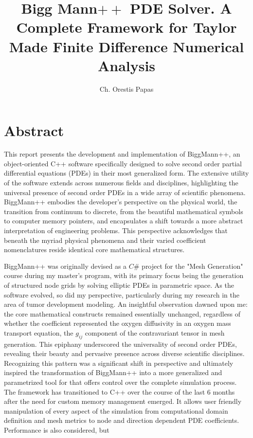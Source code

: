 \documentclass{article}
\title{Bigg Mann$++$ PDE Solver. A Complete Framework for Taylor Made Finite Difference Numerical Analysis}
\author{Ch. Orestis Papas}
\begin{document}
	\maketitle
	
	\section{Abstract}
	This report presents the development and implementation of BiggMann++, an object-oriented C++ software specifically designed to solve second order partial differential equations (PDEs) in their most generalized form. The extensive utility of the software extends across numerous fields and disciplines, highlighting the universal presence of second order PDEs in a wide array of scientific phenomena. BiggMann++ embodies the developer's perspective on the physical world, the transition from continuum to discrete, from the beautiful mathematical symbols to computer memory pointers, and encapsulates a shift towards a more abstract interpretation of engineering problems. This perspective acknowledges that beneath the myriad physical phenomena and their varied coefficient nomenclatures reside identical core mathematical structures.
	
	BiggMann++ was originally devised as a $C\#$ project for the "Mesh Generation" course during my master's program, with its primary focus being the generation of structured node grids by solving elliptic PDEs in parametric space. As the software evolved, so did my perspective, particularly during my research in the area of tumor development modeling. An insightful observation dawned upon me: the core mathematical constructs remained essentially unchanged, regardless of whether the coefficient represented the oxygen diffusivity in an oxygen mass transport equation, the $g_{ij}$ component of the contravariant tensor in mesh generation. This epiphany underscored the universality of second order PDEs, revealing their beauty and pervasive presence across diverse scientific disciplines. Recognizing this pattern was a significant shift in perspective and ultimately inspired the transformation of BiggMann++ into a more generalized and parametrized tool for that offers control over the complete simulation process. The framework has transitioned to C++ over the course of the last 6 months after the need for custom memory management emerged. It allows user friendly manipulation of every aspect of the simulation from computational domain definition and mesh metrics to node and direction dependent PDE coefficients. Performance is also considered, but 
	
\end{document}
